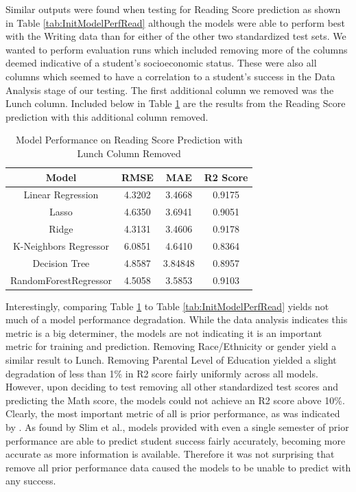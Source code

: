 \documentclass[man,floatsintext]{apa6} %
\begin{document}
Similar outputs were found when testing for Reading Score prediction as shown in Table \ref{tab:InitModelPerfRead} although the models were able to perform best with the Writing data than for either of the other two standardized test sets.
We wanted to perform evaluation runs which included removing more of the columns deemed indicative of a student's socioeconomic status. These were also all columns which seemed to have a correlation to a student's success in the Data Analysis stage of our testing.
The first additional column we removed was the Lunch column. Included below in Table \ref{tab:ReadNoLunch} are the results from the Reading Score prediction with this additional column removed.
\begin{table}[H]
    \centering
    \begin{tabular}{|c|c|c|c|}
    \hline
         Model & RMSE & MAE & R2 Score\\
         \hline\hline
         Linear Regression & 4.3202 & 3.4668 & 0.9175 \\
         \hline
         Lasso & 4.6350 & 3.6941 & 0.9051 \\
         \hline
         Ridge & 4.3131 & 3.4606 & 0.9178 \\
         \hline
         K-Neighbors Regressor & 6.0851 & 4.6410 & 0.8364 \\
         \hline
         Decision Tree & 4.8587 & 3.84848 & 0.8957 \\
         \hline
         RandomForestRegressor & 4.5058 & 3.5853 & 0.9103 \\
         \hline
    \end{tabular}
    \caption{Model Performance on Reading Score Prediction with Lunch Column Removed}
    \label{tab:ReadNoLunch}
\end{table}
Interestingly, comparing Table \ref{tab:ReadNoLunch} to Table \ref{tab:InitModelPerfRead} yields not much of a model performance degradation. While the data analysis indicates this metric is a big determiner, the models are not indicating it is an important metric for training and prediction.
Removing Race/Ethnicity or gender yield a similar result to Lunch. Removing Parental Level of Education yielded a slight degradation of less than 1\% in R2 score fairly uniformly across all models.  However, upon deciding to test removing all other standardized test scores and predicting the Math score, the models could not achieve an R2 score above 10\%.  Clearly, the most important metric of all is prior performance, as was indicated by \cite{7008697}. As found by Slim et al., models provided with even a single semester of prior performance are able to predict student success fairly accurately, becoming more accurate as more information is available. Therefore it was not surprising that remove all prior performance data caused the models to be unable to predict with any success.
\end{document}
